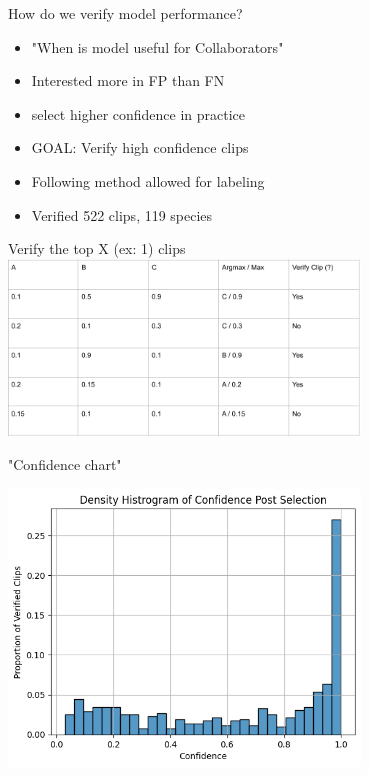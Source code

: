 \begin{frame}{How do we verify model performance?}
    \begin{itemize}
        \item "When is model useful for Collaborators"
        \item Interested more in FP than FN
        \item select higher confidence in practice
        \item GOAL: Verify high confidence clips
        \item Following method allowed for labeling
        \item Verified 522 clips, 119 species
    \end{itemize}
\end{frame}

\begin{frame}{Verify the top X (ex: 1) clips}
    \centering
    \includegraphics[height=0.7\textheight,width=0.7\textwidth,keepaspectratio]{./images/clip_selection_process.png}
\end{frame}

\begin{frame}{"Confidence chart"}

    \centering
    \includegraphics[height=0.7\textheight,width=0.7\textwidth,keepaspectratio]{./images/prop_confidence.png}

\end{frame}

